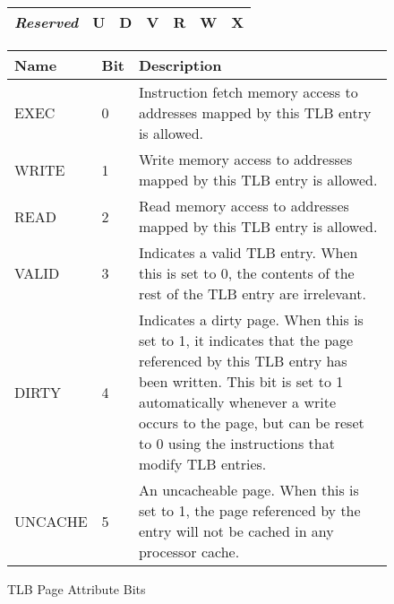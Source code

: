 \begin{figure}[ht]
\caption{\label{TLB-attr-bits} TLB Page Attribute Bits}

\begin{center}
\begin{tabular}{|p{1.0in}|p{0.2in}|p{0.2in}|p{0.2in}|p{0.2in}|p{0.2in}|p{0.2in}|}
\hline
        {\em Reserved} & U & D & V & R & W & X \\
\hline
\end{tabular}
\end{center}

\begin{center}
\begin{tabular}{|l|l|p{4in}|}
\hline
{\bf Name}      & {\bf Bit}     & {\bf Description} \\
\hline
\hline
{\sc EXEC}      & 0     & Instruction fetch memory access to addresses mapped
                                by this TLB entry is allowed. \\
\hline
{\sc WRITE}     & 1     & Write memory access to addresses mapped
                                by this TLB entry is allowed. \\
\hline
{\sc READ}      & 2     & Read memory access to addresses mapped
                                by this TLB entry is allowed.  \\
\hline
{\sc VALID}     & 3     & Indicates a valid TLB entry.  When this is
                        set to 0, the contents of the rest of the TLB
                        entry are irrelevant.  \\

\hline
{\sc DIRTY}     & 4     & Indicates a dirty page.  When this is set to 1,
                        it indicates that the page referenced by this TLB
                        entry has been written.  This bit is set to 1
                        automatically whenever a write occurs to the page,
                        but can be reset to 0 using the instructions that
                        modify TLB entries. \\

\hline
{\sc UNCACHE}   & 5     & An uncacheable page.  When this is set to 1,
                        the page referenced by the entry will not be
                        cached in any processor cache.  \\

\hline
\end{tabular}
\end{center}
\end{figure}

